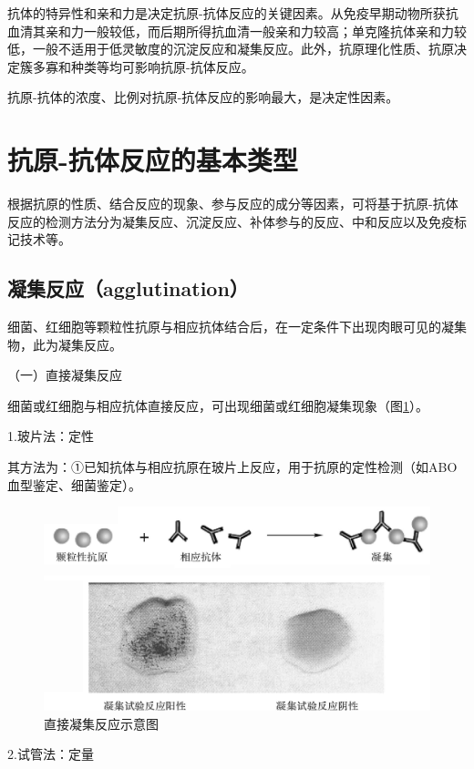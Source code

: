 抗体的特异性和亲和力是决定抗原-抗体反应的关键因素。从免疫早期动物所获抗血清其亲和力一般较低，而后期所得抗血清一般亲和力较高；单克隆抗体亲和力较低，一般不适用于低灵敏度的沉淀反应和凝集反应。此外，抗原理化性质、抗原决定簇多寡和种类等均可影响抗原-抗体反应。

抗原-抗体的浓度、比例对抗原-抗体反应的影响最大，是决定性因素。

\section{抗原-抗体反应的基本类型}

根据抗原的性质、结合反应的现象、参与反应的成分等因素，可将基于抗原-抗体反应的检测方法分为凝集反应、沉淀反应、补体参与的反应、中和反应以及免疫标记技术等。


\subsection{凝集反应（agglutination）}

细菌、红细胞等颗粒性抗原与相应抗体结合后，在一定条件下出现肉眼可见的凝集物，此为凝集反应。

（一）直接凝集反应

细菌或红细胞与相应抗体直接反应，可出现细菌或红细胞凝集现象（图\ref{fig10-2}）。

1.玻片法：定性

其方法为：①已知抗体与相应抗原在玻片上反应，用于抗原的定性检测（如ABO血型鉴定、细菌鉴定）。

\begin{figure}[!htbp]
 \centering
 \includegraphics{./images/Image00153.jpg}
 \captionsetup{justification=centering}
 \caption{直接凝集反应示意图}
 \label{fig10-2}
  \end{figure} 

2.试管法：定量

